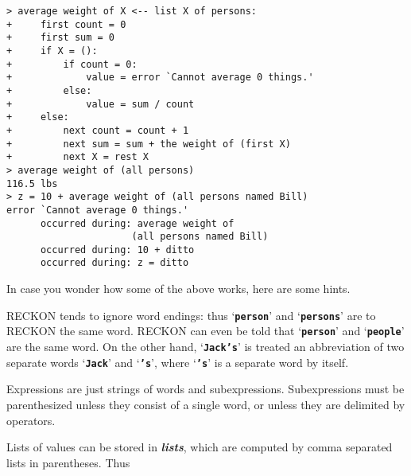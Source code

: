 \documentclass[12pt]{article}
\newcommand{\TT}[1]{{\tt \bfseries #1}}
\newcommand{\skey}[2]{{\bf \em #1#2}\index{#1}}
\newenvironment{indpar}[1][0.3in]%
	{\begin{list}{}%
		     {\setlength{\itemsep}{0in}%
		      \setlength{\topsep}{0in}%
		      \setlength{\parsep}{1ex}%
		      \setlength{\labelwidth}{#1}%
		      \setlength{\leftmargin}{#1}%
		      \addtolength{\leftmargin}{\labelsep}}%
	 \item}%
	{\end{list}}
\begin{document}
\begin{indpar}
\verb|> average weight of X <-- list X of persons:| \\
\verb|+     first count = 0| \\
\verb|+     first sum = 0| \\
\verb|+     if X = ():| \\
\verb|+         if count = 0:| \\
\verb|+             value = error `Cannot average 0 things.'| \\
\verb|+         else:| \\
\verb|+             value = sum / count| \\
\verb|+     else:| \\
\verb|+         next count = count + 1| \\
\verb|+         next sum = sum + the weight of (first X)| \\
\verb|+         next X = rest X| \\
\verb|> average weight of (all persons)| \\
\verb|116.5 lbs| \\
\verb|> z = 10 + average weight of (all persons named Bill)| \\
\verb|error `Cannot average 0 things.'| \\
\verb|      occurred during: average weight of| \\
\verb|                      (all persons named Bill)| \\
\verb|      occurred during: 10 + ditto| \\
\verb|      occurred during: z = ditto|
\end{indpar}

In case you wonder how some of the above works, here are some hints.

RECKON tends to ignore word endings: thus `\TT{person}' and
`\TT{persons}' are to RECKON the same word.
RECKON can even be told that `\TT{person}'
and `\TT{people}' are the same word.
On the other hand, `\TT{Jack's}' is treated an abbreviation
of two separate words `\TT{Jack}' and `\TT{'s}', where `\TT{'s}' is
a separate word by itself.

Expressions are just strings of words and subexpressions.  Subexpressions
must be parenthesized unless they consist of a single word, or unless
they are delimited by operators.

Lists of values can be stored in \skey{list}s, which are computed by comma
separated lists in parentheses.  Thus
\end{document}
